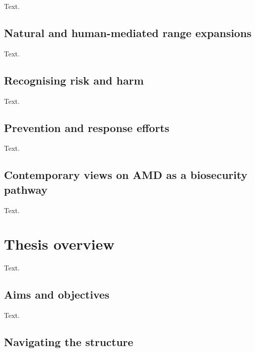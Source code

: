 \documentclass[a4paper, nobind]{templates/ociamthesis}
\begin{document}
Text.

\hypertarget{natural-and-human-mediated-range-expansions}{%
\subsection{Natural and human-mediated range expansions}\label{natural-and-human-mediated-range-expansions}}

Text.

\hypertarget{recognising-risk-and-harm}{%
\subsection{Recognising risk and harm}\label{recognising-risk-and-harm}}

Text.

\hypertarget{prevention-and-response-efforts}{%
\subsection{Prevention and response efforts}\label{prevention-and-response-efforts}}

Text.

\hypertarget{contemporary-views-on-amd-as-a-biosecurity-pathway}{%
\subsection{Contemporary views on AMD as a biosecurity pathway}\label{contemporary-views-on-amd-as-a-biosecurity-pathway}}

Text.

\hypertarget{thesis-overview}{%
\section{Thesis overview}\label{thesis-overview}}

Text.

\hypertarget{aims-and-objectives}{%
\subsection{Aims and objectives}\label{aims-and-objectives}}

Text.

\hypertarget{navigating-the-structure}{%
\subsection{Navigating the structure}\label{navigating-the-structure}}
\end{document}
